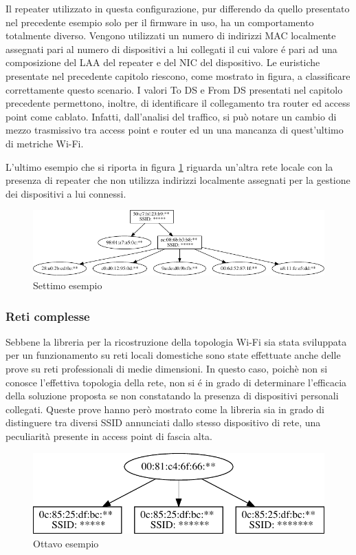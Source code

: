 Il repeater utilizzato in questa configurazione, pur differendo da quello presentato nel precedente esempio solo per il firmware in uso, ha un comportamento totalmente diverso.
Vengono utilizzati un numero di indirizzi MAC localmente assegnati pari al numero di dispositivi a lui collegati il cui valore \'e pari ad una composizione del LAA del repeater e del NIC del dispositivo.
Le euristiche presentate nel precedente capitolo riescono, come mostrato in figura, a classificare correttamente questo scenario.
I valori To DS e From DS presentati nel capitolo precedente permettono, inoltre, di identificare il collegamento tra router ed access point come cablato.
Infatti, dall'analisi del traffico, si pu\`o notare un cambio di mezzo trasmissivo tra access point e router ed un una mancanza di quest'ultimo di metriche Wi-Fi.

L'ultimo esempio che si riporta in figura \ref{fig:es7} riguarda un'altra rete locale con la presenza di repeater che non utilizza indirizzi localmente assegnati per la gestione dei dispositivi a lui connessi.
  
\begin{figure}[!h]
	\centering
	\includegraphics{images/img14censored.pdf}
	\caption{Settimo esempio}
	\label{fig:es7}
\end{figure}

\subsubsection{Reti complesse}
Sebbene la libreria per la ricostruzione della topologia Wi-Fi sia stata sviluppata per un funzionamento su reti locali domestiche sono state effettuate anche delle prove su reti professionali di medie dimensioni.
In questo caso, poich\`e non si conosce l'effettiva topologia della rete, non si \'e in grado di determinare l'efficacia della soluzione proposta se non constatando la presenza di dispositivi personali collegati.
Queste prove hanno per\`o mostrato come la libreria sia in grado di distinguere tra diversi SSID annunciati dallo stesso dispositivo di rete, una peculiarit\`a presente in access point di fascia alta.


\begin{figure}[!h]
	\centering
	\includegraphics{images/img15censored.pdf}
	\caption{Ottavo esempio}
	\label{fig:es8}
\end{figure}

